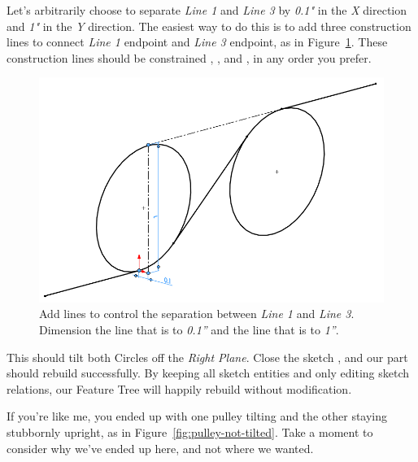 Let's arbitrarily choose to separate \emph{Line 1} and \emph{Line 3} by \emph{0.1"} in
the \emph{X} direction and \emph{1"} in the \emph{Y} direction. The easiest way to do this
is to add three construction lines to connect \emph{Line 1} endpoint and
\emph{Line 3} endpoint, as in
Figure~\ref{fig:pulley-tilt-lines}. These construction lines should be
constrained , , and , in
any order you prefer.

\begin{figure}[H]
\begin{center}
  \includegraphics[width=5in]{images/figures/pulley-tilt-lines.png}
\end{center}
\caption{Add lines to control the separation between \emph{Line 1} and \emph{Line 3}.
Dimension the line that is  to \emph{0.1''} and the line that is
 to \emph{1''}.
\label{fig:pulley-tilt-lines}}

\end{figure}

This should tilt both
Circles off the \emph{Right Plane}. Close the sketch
, and our part should rebuild
successfully. By keeping all sketch entities and only editing sketch relations,
our Feature Tree will happily rebuild without modification.

If you're like me, you ended up with one pulley tilting and the other staying
stubbornly upright, as in Figure~\ref{fig:pulley-not-tilted}. Take a moment to
consider why we've ended up here, and not where we wanted.

